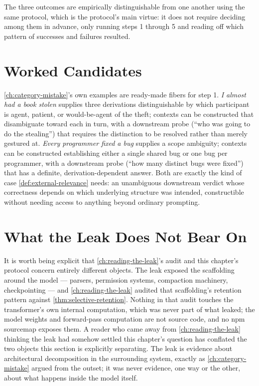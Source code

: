 \documentclass[11pt]{book}
\theoremstyle{plain}
\theoremstyle{definition}
\theoremstyle{remark}
\begin{document}
The three outcomes are empirically distinguishable from one another
using the same protocol, which is the protocol's main virtue: it does
not require deciding among them in advance, only running steps 1
through 5 and reading off which pattern of successes and failures
resulted.

\section{Worked Candidates}

\cref{ch:category-mistake}'s own examples are ready-made fibers for
step 1. \emph{I almost had a book stolen} supplies three derivations
distinguishable by which participant is agent, patient, or
would-be-agent of the theft; contexts can be constructed that
disambiguate toward each in turn, with a downstream probe (\enquote{who
was going to do the stealing}) that requires the distinction to be
resolved rather than merely gestured at. \emph{Every programmer fixed
a bug} supplies a scope ambiguity; contexts can be constructed
establishing either a single shared bug or one bug per programmer,
with a downstream probe (\enquote{how many distinct bugs were fixed})
that has a definite, derivation-dependent answer. Both are exactly the
kind of case \cref{def:external-relevance} needs: an unambiguous
downstream verdict whose correctness depends on which underlying
structure was intended, constructible without needing access to
anything beyond ordinary prompting.

\section{What the Leak Does Not Bear On}

It is worth being explicit that \cref{ch:reading-the-leak}'s audit and
this chapter's protocol concern entirely different objects. The leak
exposed the scaffolding around the model --- parsers, permission
systems, compaction machinery, checkpointing --- and
\cref{ch:reading-the-leak} audited that scaffolding's retention pattern
against \cref{thm:selective-retention}. Nothing in that audit touches
the transformer's own internal computation, which was never part of
what leaked; the model weights and forward-pass computation are not
source code, and no npm sourcemap exposes them. A reader who came away
from \cref{ch:reading-the-leak} thinking the leak had somehow settled
this chapter's question has conflated the two objects this section
is explicitly separating. The leak is evidence about architectural
decomposition in the surrounding system, exactly as
\cref{ch:category-mistake} argued from the outset; it was never
evidence, one way or the other, about what happens inside the model
itself.
\end{document}
